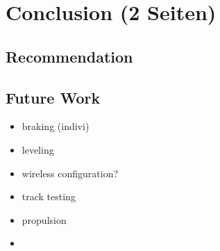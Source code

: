 \documentclass[ExampleMasters.tex]{subfiles}
\begin{document}
\clearpage
\chapter{Conclusion (2 Seiten)}
\label{chap:conclusion}

\section{Recommendation}
\label{sec:recommendation}



\section{Future Work}
\label{sec:future_work}

\begin{itemize}
	\item braking (indivi)
	\item leveling
	\item wireless configuration?
	\item track testing
	\item propulsion
	\item 
\end{itemize}
\end{document}
